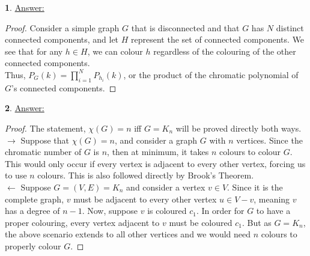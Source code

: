 \documentclass[12pt,a4paper]{article}
\theoremstyle{definition}
\newtheorem{problem}{}
\begin{document}
\begin{problem} \underline{Answer:}
\begin{proof}
Consider a simple graph $G$ that is disconnected and that $G$ has $N$ distinct connected components, and let $H$ represent the set of connected components. We see that for any $h \in H$, we can colour $h$ regardless of the colouring of the other connected components. \\

Thus, $P_G(k) = \prod_{i = 1}^{N} P_{h_i}(k)$, or the product of the chromatic polynomial of $G$'s connected components.
\end{proof}
\end{problem}

\begin{problem} \underline{Answer:} 
\begin{proof} The statement, $\chi(G) = n$ iff $G = K_n$ will be proved directly both ways. \\

$\rightarrow$ Suppose that $\chi(G) = n$, and consider a graph $G$ with $n$ vertices. Since the chromatic number of $G$ is $n$, then at minimum, it takes $n$ colours to colour $G$. This would only occur if every vertex is adjacent to every other vertex, forcing us to use $n$ colours. This is also followed directly by Brook's Theorem. \\

$\leftarrow$ Suppose $G = (V, E) = K_n$ and consider a vertex $v \in V$. Since it is the complete graph, $v$ must be adjacent to every other vertex $u \in V - v$, meaning $v$ has a degree of $n - 1$. Now, suppose $v$ is coloured $c_1$. In order for $G$ to have a proper colouring, every vertex adjacent to $v$ must be coloured $c_1$. But as $G = K_n$, the above scenario extends to all other vertices and we would need $n$ colours to properly colour $G$.
\end{proof}
\end{problem}
\end{document}
